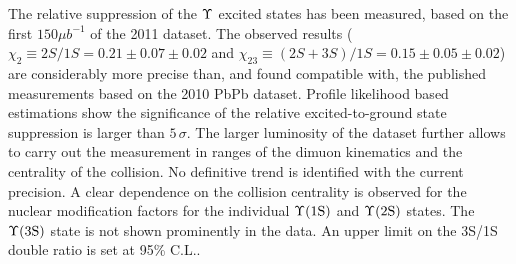 
The relative suppression of the $\Upsilon$ excited states has been measured, based on the first $150 \mu b^{-1}$ of the 2011 \PbPb dataset.
The observed results ($\chi_{2}\equiv 2S/1S=0.21 \pm 0.07 \pm 0.02$ and $\chi_{23}\equiv(2S+3S)/1S=0.15 \pm 0.05 \pm 0.02$) are considerably more precise than, and found compatible with, the published measurements based on the 2010 PbPb dataset. 
%
Profile likelihood based estimations show the significance of the relative excited-to-ground state suppression is larger than $5\,\sigma$.
The larger luminosity of the \PbPb dataset further allows to carry out the measurement in ranges of the dimuon kinematics and the centrality of the collision. 
No definitive trend is identified with the current precision. 
A clear dependence on the collision centrality is observed for the nuclear modification factors for the individual $\Upsilon\text{(1S)}$ and $\Upsilon\text{(2S)}$ states. 
The $\Upsilon\mathrm{(3S)}$ state is not shown prominently in the \PbPb data. 
An upper limit on the 3S/1S double ratio is set at 95\% C.L..
 
\vfill

